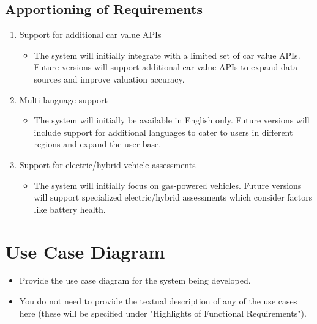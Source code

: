 \documentclass[]{article}
\begin{document}
\subsection{Apportioning of Requirements}
\label{sub:apportioning_of_requirements}
\begin{enumerate}
	\item Support for additional car value APIs
	\begin{itemize}
    \item The system will initially integrate with a limited set of car value APIs. Future versions will support additional car value APIs to expand data sources and improve valuation accuracy.
  \end{itemize}
	\item Multi-language support
	\begin{itemize}
    \item The system will initially be available in English only. Future versions will include support for additional languages to cater to users in different regions and expand the user base.
  \end{itemize}
	\item Support for electric/hybrid vehicle assessments
	\begin{itemize}
    \item The system will initially focus on gas-powered vehicles. Future versions will support specialized electric/hybrid assessments which consider factors like battery health.
  \end{itemize} 
\end{enumerate}

\section{Use Case Diagram}
\label{sec:use_case_diagram}
\begin{itemize}
	\item Provide the use case diagram for the system being developed.
	\item You do not need to provide the textual description of any of the use cases here (these will be specified under "Highlights of Functional Requirements").
\end{itemize}
\end{document}
